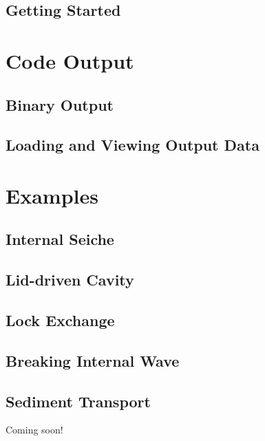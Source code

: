 \documentclass[12pt]{report}
\begin{document}
\section{Getting Started}
 
\chapter{Code Output}

\section{Binary Output}

\section{Loading and Viewing Output Data}

\chapter{Examples}

\section{Internal Seiche}

\section{Lid-driven Cavity}

\section{Lock Exchange}

\section{Breaking Internal Wave}

\section{Sediment Transport}
Coming soon!



\end{document}
